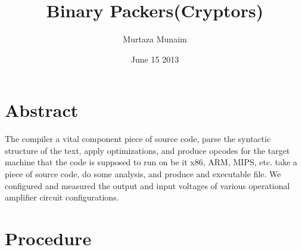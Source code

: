\documentclass{article}
\title{Binary Packers(Cryptors)}
\author{Murtaza Munaim}
\date{June 15 2013}
\begin{document}
\maketitle

\section{Abstract}
The compiler  a vital component  piece of source code, parse the syntactic structure of the text, apply optimizations, and produce opcodes for the
target machine that the code is supposed to run on be it x86, ARM, MIPS, etc.  take a piece of source code, do some analysis, and produce and executable file. 
We configured and measured the output and input voltages of various
operational amplifier circuit configurations.

\section{Procedure}
\end{document}
